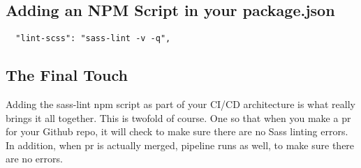 \subsection{Adding an NPM Script in your package.json}
\begin{verbatim}
  "lint-scss": "sass-lint -v -q",
\end{verbatim}

\subsection{The Final Touch}

Adding the sass-lint npm script as part of your CI/CD architecture is what
really brings it all together. This is twofold of course. One so that when you
make a pr for your Github repo, it will check to make sure there are no Sass
linting errors. In addition, when pr is actually merged, pipeline runs as well,
to make sure there are no errors.
